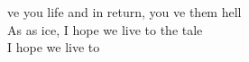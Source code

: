  ve you life \songwordfb{} and in return, you ve them hell \songwordfb{}\\
As  as ice, \songwordfb{} I hope we live to  the tale \songwordfb{}\\
I hope we live to  \\
 
 